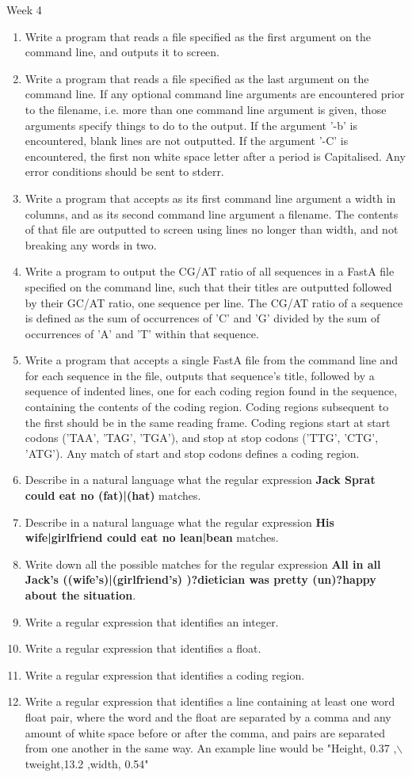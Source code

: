 \hypertarget{week4}{Week 4}
\begin{enumerate}
	\item Write a program that reads a file specified as the first argument on the command line, and outputs it to screen.
	\item Write a program that reads a file specified as the last argument on the command line. If any optional command line arguments are encountered prior to the filename, i.e. more than one command line argument is given, those    arguments specify things to do to the output. If the argument '-b' is encountered, blank lines are not outputted. If the argument '-C' is encountered, the first non white space letter after a period is Capitalised. Any error conditions should be    sent to stderr.
	\item Write a program that accepts as its first command line argument a width in columns, and as its second command line argument a filename. The contents of that file are outputted to screen using lines no longer than width, and not    breaking any words in two.
	\item Write a program to output the CG/AT ratio of all sequences in a FastA file specified on the command line, such that their titles are outputted followed by their GC/AT ratio, one sequence per line. The CG/AT ratio of a sequence    is defined as the sum of occurrences of 'C' and 'G' divided by the sum of occurrences of 'A' and 'T' within that sequence.
	\item Write a program that accepts a single FastA file from the command line and for each sequence in the file, outputs that sequence's title, followed by a sequence of indented lines, one for each coding region found in the sequence,    containing the contents of the coding region. Coding regions subsequent to the first should be in the same reading frame. Coding regions start at start codons ('TAA', 'TAG', 'TGA'), and stop at stop codons ('TTG', 'CTG', 'ATG'). Any match of start    and stop codons defines a coding region.
	\item Describe in a natural language what the regular expression \textbf{Jack Sprat could eat no (fat)|(hat)} matches.
	\item Describe in a natural language what the regular expression \textbf{His wife|girlfriend could eat no lean|bean} matches.
	\item Write down all the possible matches for the regular expression \textbf{All in all Jack's ((wife's)|(girlfriend's) )?dietician was pretty (un)?happy about the situation}.
	\item Write a regular expression that identifies an integer.
	\item Write a regular expression that identifies a float.
	\item Write a regular expression that identifies a coding region.
	\item Write a regular expression that identifies a line containing at least one word float pair, where the word and the float are separated by a comma and any amount of white space before or after the comma, and pairs are separated    from one another in the same way. An example line would be "Height, 0.37 ,$\backslash$tweight,13.2 ,width, 0.54"
\end{enumerate}

